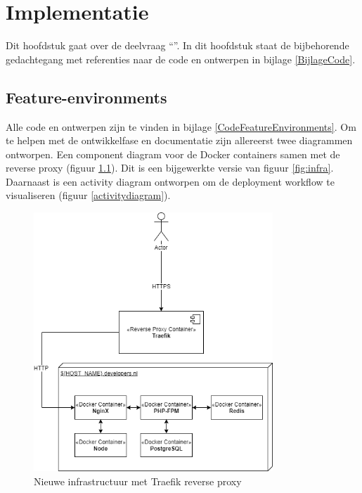 \chapter{Implementatie}

\label{Chapter6}

Dit hoofdstuk gaat over de deelvraag \enquote{\deelimplementatie}. In dit hoofdstuk staat de bijbehorende gedachtegang met referenties naar de code en ontwerpen in bijlage \ref{BijlageCode}.

\section{Feature-environments}

Alle code en ontwerpen zijn te vinden in bijlage \ref{CodeFeatureEnvironments}. Om te helpen met de ontwikkelfase en documentatie zijn allereerst twee diagrammen ontworpen. Een component diagram voor de Docker containers samen met de reverse proxy (figuur \ref{traefikinfrastructure}). Dit is een bijgewerkte versie van figuur \ref{fig:infra}. Daarnaast is een activity diagram ontworpen om de deployment workflow te visualiseren (figuur \ref{activitydiagram}).

\begin{figure}[H]
	\centering
	\includegraphics[width=9cm]{Figures/Traefik}
	\decoRule
	\caption[Traefik Infrastructure]{Nieuwe infrastructuur met Traefik reverse proxy}
	\label{traefikinfrastructure}
\end{figure}

